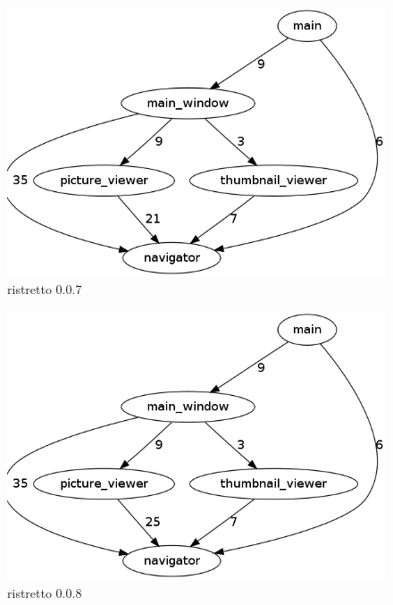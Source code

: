 \begin{figure}[h]
\center
\includegraphics[scale=0.4]{imagens/ristretto-0_0_7-doxyparse-2}
\caption{ristretto 0.0.7}
\label{fig:ristretto-0.0.7-doxyparse-2-anexo}
\end{figure}

\begin{figure}[h]
\center
\includegraphics[scale=0.4]{imagens/ristretto-0_0_8-doxyparse-2}
\caption{ristretto 0.0.8}
\label{fig:ristretto-0.0.8-doxyparse-2-anexo}
\end{figure}

